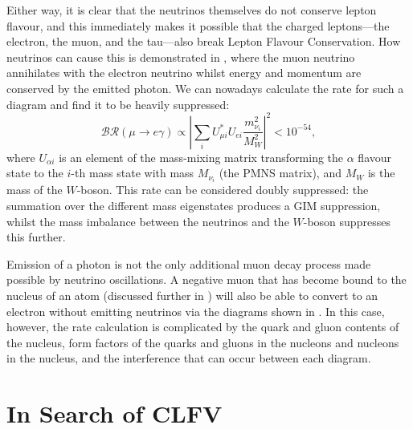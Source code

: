 \FigTheoryMuEConvViaNeutrino
Either way, it is clear that the neutrinos themselves do not conserve lepton flavour, and this immediately makes it possible that the charged leptons---the electron, the muon, and the tau---also break Lepton Flavour Conservation.
How neutrinos can cause this is demonstrated in , where the muon neutrino annihilates with the electron neutrino whilst energy and momentum are conserved by the emitted photon.
We can nowadays calculate the rate for such a diagram and find it to be heavily suppressed:
\begin{equation}
\mathcal{BR}(\mu\rightarrow{}e\gamma)\propto\left|\sum_iU^*_{\mu i}U_{ei} \frac{m^2_{\nu_i}}{M^2_W}\right|^2 < 10^{-54},
\end{equation}
where $U_{\alpha i}$ is an element of the mass-mixing matrix transforming the $\alpha$ flavour state to the $i$-th mass state with mass $M_{\nu_i}$ (the \ac{PMNS} matrix), and $M_W$ is the mass of the $W$-boson.
This rate can be considered doubly suppressed: the summation over the different mass eigenstates produces a GIM suppression, whilst the mass imbalance between the neutrinos and the $W$-boson suppresses this further.

Emission of a photon is not the only additional muon decay process made possible by neutrino oscillations.
A negative muon that has become bound to the nucleus of an atom (discussed further in ) will also be able to convert to an electron without emitting neutrinos via the diagrams
shown in .  
In this case, however, the rate calculation is complicated by the quark and gluon contents of the nucleus, form factors of the quarks and gluons in the nucleons and nucleons in the nucleus, and the interference that can occur between each diagram.

\section{In Search of \acf{CLFV}}
